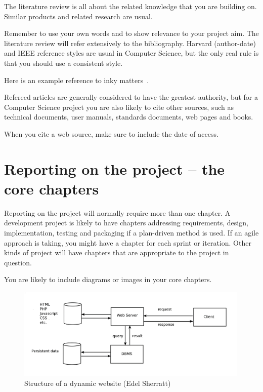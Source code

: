 \documentclass{mscthesis}
\begin{document}
The literature review is all about the related knowledge that you are building on.  Similar products and related research are usual.

Remember to use your own words and to show relevance to your project aim.
The literature review will refer extensively to the bibliography.  Harvard (author-date) and IEEE reference styles are usual in Computer Science, but the only real rule is that you should use a consistent style.

Here is an example reference to inky matters~\cite{Jones2010}. 

Refereed articles are generally considered to have the greatest authority, but for a Computer Science project you are also likely to cite other sources, such as technical documents, user manuals, standards documents, web pages and books.

When you cite a web source, make sure to include the date of access.

\chapter{Reporting on the project -- the core chapters}

Reporting on the project will normally require more than one chapter.
A development project is likely to have chapters addressing requirements, design, implementation, testing and packaging if a plan-driven method is used.  If an agile approach is taking, you might have a chapter for each sprint or iteration.
Other kinds of project will have chapters that are appropriate to the project in question.

You are likely to include diagrams or images in your core chapters.

\begin{figure}
	\label{fig-website}
	\begin{center}
		\includegraphics[width=30em]{DynamicWebsite.png}
		\caption{Structure of a dynamic website (Edel Sherratt)}
	\end{center}
\end{figure}
\end{document}
